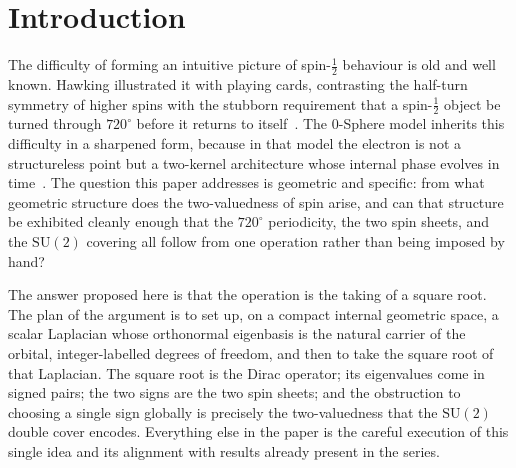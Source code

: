 \documentclass[%
 reprint, amsmath,amssymb, aps, prb, ]{revtex4-2}
\numberwithin{equation}{section}
\begin{document}
\section{Introduction}
\label{sec:intro}

The difficulty of forming an intuitive picture of spin-$\tfrac{1}{2}$ behaviour is old and well known. Hawking illustrated it with playing cards, contrasting the half-turn symmetry of higher spins with the stubborn requirement that a spin-$\tfrac{1}{2}$ object be turned through $720^{\circ}$ before it returns to itself~\cite{hanamura03}. The 0-Sphere model inherits this difficulty in a sharpened form, because in that model the electron is not a structureless point but a two-kernel architecture whose internal phase evolves in time~\cite{hanamura01}. The question this paper addresses is geometric and specific: from what geometric structure does the two-valuedness of spin arise, and can that structure be exhibited cleanly enough that the $720^{\circ}$ periodicity, the two spin sheets, and the $\mathrm{SU}(2)$ covering all follow from one operation rather than being imposed by hand?

The answer proposed here is that the operation is the taking of a square root. The plan of the argument is to set up, on a compact internal geometric space, a scalar Laplacian whose orthonormal eigenbasis is the natural carrier of the orbital, integer-labelled degrees of freedom, and then to take the square root of that Laplacian. The square root is the Dirac operator; its eigenvalues come in signed pairs; the two signs are the two spin sheets; and the obstruction to choosing a single sign globally is precisely the two-valuedness that the $\mathrm{SU}(2)$ double cover encodes. Everything else in the paper is the careful execution of this single idea and its alignment with results already present in the series.
\end{document}
